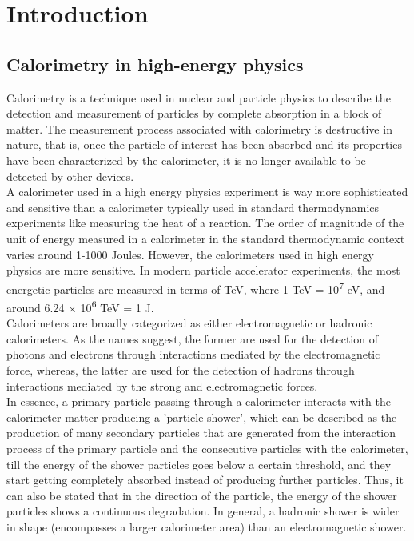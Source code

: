 \chapter{Introduction}

\section{Calorimetry in high-energy physics} %
Calorimetry is a technique used in nuclear and particle physics to describe the detection and measurement of particles by complete absorption in a block of matter. The measurement process associated with calorimetry is destructive in nature, that is, once the particle of interest has been absorbed and its properties have been characterized by the calorimeter, it is no longer available to be detected by other devices. \\

A calorimeter used in a high energy physics experiment is way more sophisticated and sensitive than a calorimeter typically used in standard thermodynamics experiments like measuring the heat of a reaction. The order of magnitude of the unit of energy measured in a calorimeter in the standard thermodynamic context varies around 1-1000 Joules. However, the calorimeters used in high energy physics are more sensitive. In modern particle accelerator experiments, the most energetic particles are measured in terms of TeV, where 1 TeV = 10\textsuperscript{7} eV, and around 6.24 × 10\textsuperscript{6 } TeV = 1 J. \\ 

Calorimeters are broadly categorized as either electromagnetic or hadronic calorimeters. As the names suggest, the former are used for the detection of photons and electrons through interactions mediated by the electromagnetic force, whereas, the latter are used for the detection of hadrons through interactions mediated by the strong and electromagnetic forces. \\

In essence, a primary particle passing through a calorimeter interacts with the calorimeter matter producing a 'particle shower', which can be described as the production of many secondary particles that are generated from the interaction process of the primary particle and the consecutive particles with the calorimeter, till the energy of the shower particles goes below a certain threshold, and they start getting completely absorbed instead of producing further particles. Thus, it can also be stated that in the direction of the particle, the energy of the shower particles shows a continuous degradation. In general, a hadronic shower is wider in shape (encompasses a larger calorimeter area) than an electromagnetic shower. \\

